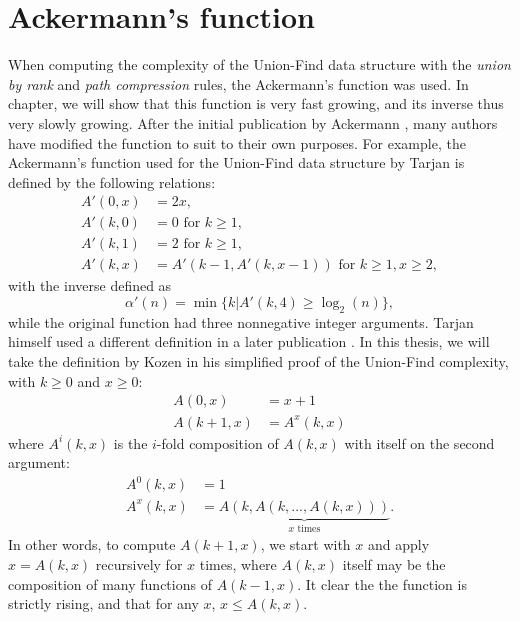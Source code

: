 \chapter{Ackermann's function}\label{ap.ackermann}

When computing the complexity of the Union-Find data structure \cite{tarjan1975efficiency} with the \emph{union by rank} and \emph{path compression} rules, the Ackermann's function was used. In chapter, we will show that this function is very fast growing, and its inverse thus very slowly growing. After the initial publication by Ackermann \cite{ackermann1928hilbertschen}, many authors have modified the function to suit to their own purposes. For example, the Ackermann's function used for the Union-Find data structure by Tarjan \cite{tarjan1975efficiency} is defined by the following relations:
\begin{align*}
    A'(0,x) &= 2x, \\
    A'(k,0) &= 0 \text{ for } k \geq 1, \\
    A'(k,1) &= 2 \text{ for } k \geq 1, \\
    A'(k,x) &= A'(k-1, A'(k, x-1)) \text{ for } k \geq 1, x \geq 2,
\end{align*}
with the inverse defined as
\begin{equation*}
    \alpha'(n) = \min \{k | A'(k,4) \geq \log_2(n)\}, 
\end{equation*}
while the original function had three nonnegative integer arguments. Tarjan himself used a different definition in a later publication \cite{tarjan1984worst}. In this thesis, we will take the definition by Kozen \cite{kozen1992design} in his simplified proof of the Union-Find complexity, with $k\geq 0$ and $x\geq 0$:
\begin{align}
    \nonumber A(0,x) &= x + 1\\
    A(k+1,x) &= A^x(k,x)
\end{align}
where $A^i(k,x)$ is the $i$-fold composition of $A(k,x)$ with itself on the second argument:
\begin{align}
    \nonumber  A^0(k,x) &= 1 \\
    A^x(k,x) &= \underbrace{A(k, A(k, ..., A(k,x)))}_{x \text{ times}}.
\end{align}
In other words, to compute $A(k+1,x)$, we start with $x$ and apply $x=A(k,x)$ recursively for $x$ times, where $A(k,x)$ itself may be the composition of many functions of $A(k-1,x)$. It clear the the function is strictly rising, and that for any $x$, $x\leq A(k,x)$. 

